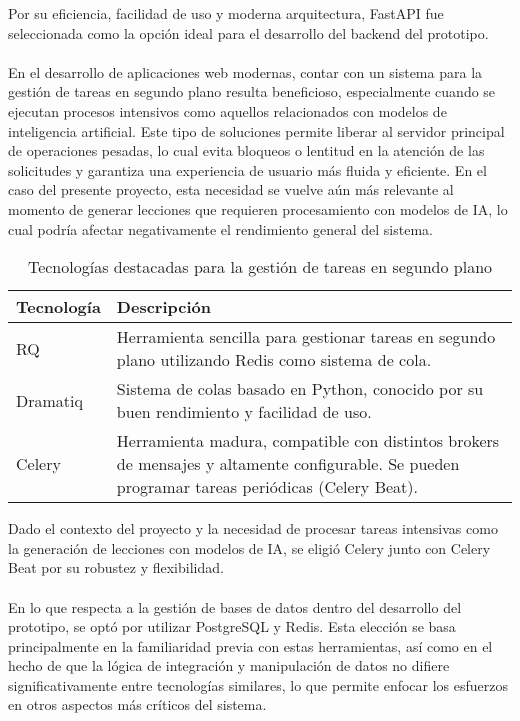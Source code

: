 \noindent Por su eficiencia, facilidad de uso y moderna arquitectura, FastAPI fue seleccionada como la opción ideal para el desarrollo del backend del prototipo.
\\
\\
En el desarrollo de aplicaciones web modernas, contar con un sistema para la gestión de tareas en segundo plano resulta  beneficioso, especialmente cuando se ejecutan procesos intensivos como aquellos relacionados con modelos de inteligencia artificial. Este tipo de soluciones permite liberar al servidor principal de operaciones pesadas, lo cual evita bloqueos o lentitud en la atención de las solicitudes y garantiza una experiencia de usuario más fluida y eficiente. En el caso del presente proyecto, esta necesidad se vuelve aún más relevante al momento de generar lecciones que requieren procesamiento con modelos de IA, lo cual podría afectar negativamente el rendimiento general del sistema. 
\begin{table}[H]
\centering
\begin{tabular}{|l|p{10cm}|}
\hline
\textbf{Tecnología } & \textbf{Descripción} \\
\hline
RQ & Herramienta sencilla para gestionar tareas en segundo plano utilizando Redis como sistema de cola. \\
\hline
Dramatiq & Sistema de colas basado en Python, conocido por su buen rendimiento y facilidad de uso. \\
\hline
Celery & Herramienta madura, compatible con distintos brokers de mensajes y altamente configurable. Se pueden programar tareas periódicas (Celery Beat). \\
\hline
\end{tabular}
\caption{Tecnologías destacadas para la gestión de tareas en segundo plano}

\end{table}

\noindent Dado el contexto del proyecto y la necesidad de procesar tareas intensivas como la generación de lecciones con modelos de IA, se eligió Celery junto con Celery Beat por su robustez y flexibilidad.
\\
\\
En lo que respecta a la gestión de bases de datos dentro del desarrollo del prototipo, se optó por utilizar PostgreSQL y Redis. Esta elección se basa principalmente en la familiaridad previa con estas herramientas, así como en el hecho de que la lógica de integración y manipulación de datos no difiere significativamente entre tecnologías similares, lo que permite enfocar los esfuerzos en otros aspectos más críticos del sistema.

